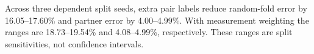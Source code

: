 Across three dependent split seeds, extra pair labels reduce random-fold error by 16.05--17.60\% and partner error by 4.00--4.99\%. With measurement weighting the ranges are 18.73--19.54\% and 4.08--4.99\%, respectively. These ranges are split sensitivities, not confidence intervals.
